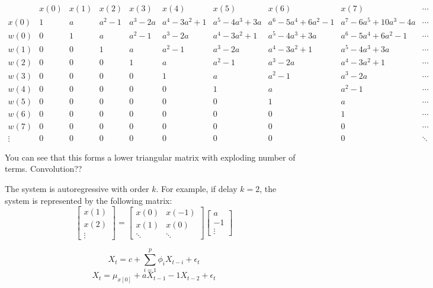 \documentclass[leqno,twocolumn]{article}
\begin{document}
{\renewcommand{\arraystretch}{2}%
$\begin{array}{c|c|c|c|c|c|c|c|c|l|}
{} & x(0) & x(1) & x(2) & x(3) & x(4) & x(5) & x(6) & x(7) & \cdots\\
\hline
x(0) & 1 & a & a^2-1 & a^3 - 2a & a^4 - 3a^2 + 1 & a^5 - 4a^3 + 3a & a^6 - 5a^4 + 6a^2 -1 & a^7 - 6a^5 + 10a^3 - 4a & \cdots\\
w(0) & 0 & 1 & a & a^2-1 & a^3 - 2a & a^4 - 3a^2 + 1 & a^5 - 4a^3 + 3a & a^6 - 5a^4 + 6a^2 -1 & \cdots \\
w(1) & 0 & 0 & 1 & a & a^2-1 & a^3 - 2a & a^4 - 3a^2 + 1 & a^5 - 4a^3 + 3a & \cdots \\
w(2) & 0 & 0 & 0 & 1 & a & a^2-1 & a^3 - 2a & a^4 - 3a^2 + 1 & \cdots \\
w(3) & 0 & 0 & 0 & 0 & 1 & a & a^2-1 & a^3 - 2a & \cdots \\
w(4) & 0 & 0 & 0 & 0 & 0 & 1 & a & a^2-1 & \cdots \\
w(5) & 0 & 0 & 0 & 0 & 0 & 0 & 1 & a & \cdots \\
w(6) & 0 & 0 & 0 & 0 & 0 & 0 & 0 & 1 & \cdots \\
w(7) & 0 & 0 & 0 & 0 & 0 & 0 & 0 & 0 & \cdots\\
\vdots & 0 & 0 & 0 & 0 & 0 & 0 & 0 & 0 & \ddots
\end{array}$ \newline \newline

You can see that this forms a lower triangular matrix with exploding number of terms. Convolution??

The system is autoregressive with order $k$. For example, if delay $k = 2$, the system is represented by the following matrix:
\[ \left[ \begin{matrix}
x(1)\\ x(2) \\ \vdots
\end{matrix} \right] = \left[ \begin{matrix}
x(0) & x(-1)\\
x(1) & x(0)\\
\ddots & \ddots
\end{matrix} \right] \left[ \begin{matrix}
a \\ -1 \\ \vdots 
\end{matrix} \right] \]

\[X_t = c + \sum_{i=1}^{p} \phi_i X_{t-i} + \epsilon_t \]
\[X_t = \mu_{x[0]} + aX_{t-1} -1X_{t-2} + \epsilon_t \]

}
\end{document}
